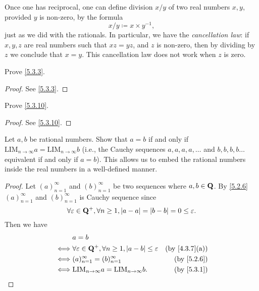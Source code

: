 \begin{note}
  Once one has reciprocal, one can define division \(x / y\) of two real numbers \(x, y\), provided \(y\) is non-zero, by the formula
  \[
    x / y \coloneqq x \times y^{-1},
  \]
  just as we did with the rationals.
  In particular, we have the \emph{cancellation law}:
  if \(x, y, z\) are real numbers such that \(xz = yz\), and \(z\) is non-zero, then by dividing by \(z\) we conclude that \(x = y\).
  This cancellation law does not work when \(z\) is zero.
\end{note}

\exercisesection

\begin{exercise}\label{ex 5.3.1}
  Prove \cref{5.3.3}.
\end{exercise}

\begin{proof}
  See \cref{5.3.3}.
\end{proof}

\begin{exercise}\label{ex 5.3.2}
  Prove \cref{5.3.10}.
\end{exercise}

\begin{proof}
  See \cref{5.3.10}.
\end{proof}

\begin{exercise}\label{ex 5.3.3}
  Let \(a, b\) be rational numbers.
  Show that \(a = b\) if and only if \(\text{LIM}_{n \to \infty} a = \text{LIM}_{n \to \infty} b\) (i.e., the Cauchy sequences \(a, a, a, a, \dots\) and \(b, b, b, b \dots\) equivalent if and only if \(a = b\)).
  This allows us to embed the rational numbers inside the real numbers in a well-defined manner.
\end{exercise}

\begin{proof}
  Let \((a)_{n = 1}^{\infty}\) and \((b)_{n = 1}^{\infty}\) be two sequences where \(a, b \in \mathbf{Q}\).
  By \cref{5.2.6} \((a)_{n = 1}^\infty\) and \((b)_{n = 1}^\infty\) is Cauchy sequence since
  \[
    \forall \varepsilon \in \mathbf{Q}^+, \forall n \geq 1, \left\lvert a - a\right\rvert = \left\lvert b - b\right\rvert = 0 \leq \varepsilon.
  \]
  Then we have
  \begin{align*}
         & a = b                                                                                                      \\
    \iff & \forall \varepsilon \in \Q^+, \forall n \geq 1, \abs{a - b} \leq \varepsilon & \text{(by \cref{4.3.7}(a))} \\
    \iff & (a)_{n = 1}^\infty = (b)_{n = 1}^\infty                                      & \text{(by \cref{5.2.6})}    \\
    \iff & \text{LIM}_{n \to \infty} a = \text{LIM}_{n \to \infty} b.                   & \text{(by \cref{5.3.1})}
  \end{align*}
\end{proof}

